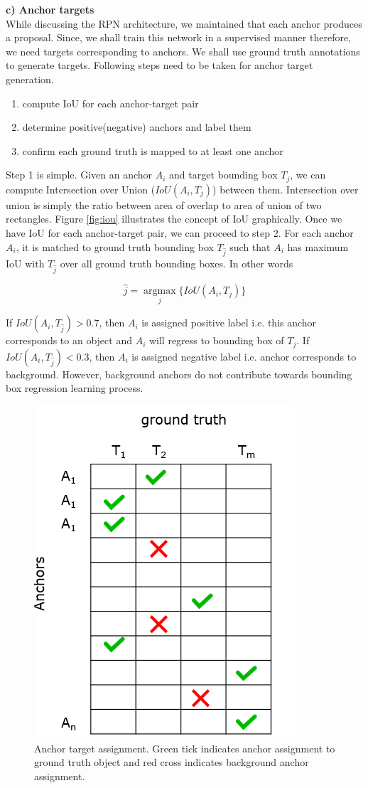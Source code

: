 \textbf{c) Anchor targets} \\
While discussing the RPN architecture, we maintained that each anchor produces a proposal. Since, we shall train this network in a supervised manner therefore, we need targets corresponding to anchors. We shall use ground truth annotations to generate targets. Following steps need to be taken for anchor target generation.
\begin{enumerate}
    \item compute IoU for each anchor-target pair
    \item determine positive(negative) anchors and label them 
    \item confirm each ground truth is mapped to  at least one anchor 
\end{enumerate}

Step 1 is simple. Given an anchor $A_i$ and target bounding box $T_j$, we can compute Intersection over Union ($IoU(A_i,T_j)$) between them. Intersection over union is simply the ratio between area of overlap to area of union of two rectangles. Figure \ref{fig:iou} illustrates the concept of IoU graphically. Once we have IoU for each anchor-target pair, we can proceed to step 2. For each anchor $A_i$, it is matched to ground truth bounding box $T_{\hat{j}}$ such that $A_i$ has maximum IoU with $T_{\hat{j}}$ over all ground truth bounding boxes. In other words

$$ \hat{j} = \operatorname*{argmax}_{j} \{ IoU(A_i,T_j) \} $$

If $IoU(A_i,T_{\hat{j}}) > 0.7$, then $A_i$ is assigned positive label i.e. this anchor corresponds to an object and $A_i$ will regress to bounding box of $T_j$. If $IoU(A_i,T_{\hat{j}}) < 0.3$, then $A_i$ is assigned negative label i.e. anchor corresponds to background. However, background anchors do not contribute towards bounding box regression learning process. 

\begin{figure}
    \centering
    \includegraphics[width=0.5\linewidth]{images/anchor-targets.PNG}
    \caption[Anchor target assignment]{Anchor target assignment. Green tick indicates anchor assignment to ground truth object and red cross indicates background anchor assignment.}
    \label{fig:anchor-targets}
\end{figure}


